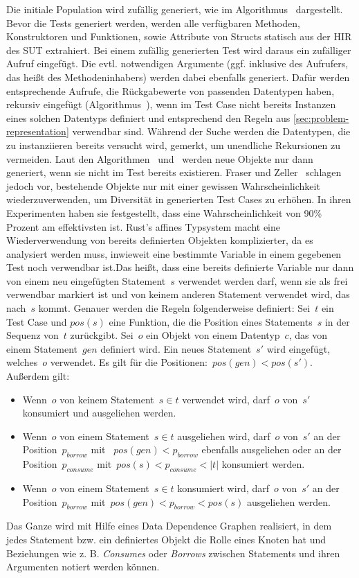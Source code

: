\documentclass{article}
\begin{document}
Die initiale Population wird zufällig generiert, wie im Algorithmus~ dargestellt. Bevor die Tests generiert werden, werden alle verfügbaren Methoden, Konstruktoren und Funktionen, sowie Attribute von Structs statisch aus der \ac{HIR} des \ac{SUT} extrahiert. Bei einem zufällig generierten Test wird daraus ein zufälliger Aufruf eingefügt. Die evtl. notwendigen Argumente (ggf. inklusive des Aufrufers, das heißt des Methodeninhabers) werden dabei ebenfalls generiert. Dafür werden entsprechende Aufrufe, die Rückgabewerte von passenden Datentypen haben, rekursiv eingefügt (Algorithmus~), wenn im Test Case nicht bereits Instanzen eines solchen Datentyps definiert und entsprechend den Regeln aus \cref{sec:problem-representation} verwendbar sind. Während der Suche werden die Datentypen, die zu instanziieren bereits versucht wird, gemerkt, um unendliche Rekursionen zu vermeiden. Laut den Algorithmen~ und~ werden neue Objekte nur dann generiert, wenn sie nicht im Test bereits existieren. Fraser und Zeller~\cite{Fraser2012} schlagen jedoch vor, bestehende Objekte nur mit einer gewissen Wahrscheinlichkeit wiederzuverwenden, um Diversität in generierten Test Cases zu erhöhen. In ihren Experimenten haben sie festgestellt, dass eine Wahrscheinlichkeit von 90\% Prozent am effektivsten ist. Rust's affines Typsystem macht eine Wiederverwendung von bereits definierten Objekten komplizierter, da es analysiert werden muss, inwieweit eine bestimmte Variable in einem gegebenen Test noch verwendbar ist.Das heißt, dass eine bereits definierte Variable nur dann von einem neu eingefügten Statement~$s$ verwendet werden darf, wenn sie als frei verwendbar markiert ist und von keinem anderen Statement verwendet wird, das nach~$s$ kommt. Genauer werden die Regeln folgenderweise definiert: Sei~$t$ ein Test Case und $pos(s)$ eine Funktion, die die Position eines Statements~$s$ in der Sequenz von~$t$ zurückgibt. Sei~$o$ ein Objekt von einem Datentyp~$c$, das von einem Statement~$gen$ definiert wird. Ein neues Statement~$s'$ wird eingefügt, welches~$o$ verwendet. Es gilt für die Positionen:~$pos(gen) < pos(s')$. Außerdem gilt:
\begin{itemize}
    \item Wenn~$o$ von keinem Statement~$s \in t$ verwendet wird, darf~$o$ von~$s'$ konsumiert und ausgeliehen werden.
    \item Wenn~$o$ von einem Statement~$s \in t$ ausgeliehen wird, darf~$o$ von~$s'$ an der Position~$p_{borrow}$ mit ~$pos(gen) < p_{borrow}$ ebenfalls ausgeliehen oder an der Position~$p_{consume}$ mit~$pos(s) < p_{consume} < \left|t\right|$ konsumiert werden.
    \item Wenn~$o$ von einem Statement~$s \in t$ konsumiert wird, darf~$o$ von~$s'$ an der Position~$p_{borrow}$ mit~$pos(gen) < p_{borrow} < pos(s)$ ausgeliehen werden.
\end{itemize}
Das Ganze wird mit Hilfe eines Data Dependence Graphen realisiert, in dem jedes Statement bzw. ein definiertes Objekt die Rolle eines Knoten hat und Beziehungen wie z. B. \textit{Consumes} oder \textit{Borrows} zwischen Statements und ihren Argumenten notiert werden können.
\end{document}
